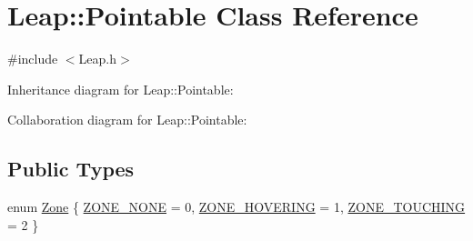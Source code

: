 \hypertarget{class_leap_1_1_pointable}{}\section{Leap\+:\+:Pointable Class Reference}
\label{class_leap_1_1_pointable}


{\ttfamily \#include $<$Leap.\+h$>$}



Inheritance diagram for Leap\+:\+:Pointable\+:


Collaboration diagram for Leap\+:\+:Pointable\+:
\subsection*{Public Types}
\begin{DoxyCompactItemize}
\item 
enum \hyperlink{class_leap_1_1_pointable_ad6e50b9878b8c1fdf899b5e09721deef}{Zone} \{ \hyperlink{class_leap_1_1_pointable_ad6e50b9878b8c1fdf899b5e09721deefa4c1e87f878b5a0a3d1ac4903f92e29fe}{Z\+O\+N\+E\+\_\+\+N\+O\+NE} = 0, 
\hyperlink{class_leap_1_1_pointable_ad6e50b9878b8c1fdf899b5e09721deefad8f42b8833b8233e2b196863b5937f3c}{Z\+O\+N\+E\+\_\+\+H\+O\+V\+E\+R\+I\+NG} = 1, 
\hyperlink{class_leap_1_1_pointable_ad6e50b9878b8c1fdf899b5e09721deefa9ccf7859ad8c4f411779d04fbdb23e23}{Z\+O\+N\+E\+\_\+\+T\+O\+U\+C\+H\+I\+NG} = 2
 \}
\end{DoxyCompactItemize}
